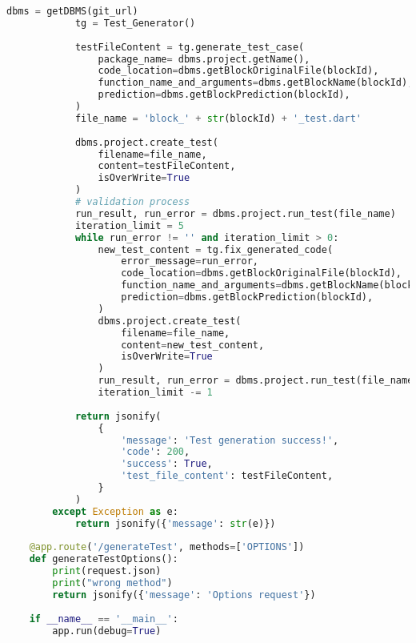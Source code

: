 \begin{lstlisting}[language=Python, caption={$\texttt{main.py}$ file.}, label={lst:15}]
            dbms = getDBMS(git_url)
            tg = Test_Generator()
            
            testFileContent = tg.generate_test_case(
                package_name= dbms.project.getName(),
                code_location=dbms.getBlockOriginalFile(blockId),
                function_name_and_arguments=dbms.getBlockName(blockId),
                prediction=dbms.getBlockPrediction(blockId),
            )
            file_name = 'block_' + str(blockId) + '_test.dart'
            
            dbms.project.create_test(
                filename=file_name,
                content=testFileContent,
                isOverWrite=True
            )
            # validation process
            run_result, run_error = dbms.project.run_test(file_name)
            iteration_limit = 5
            while run_error != '' and iteration_limit > 0:
                new_test_content = tg.fix_generated_code(
                    error_message=run_error,
                    code_location=dbms.getBlockOriginalFile(blockId),
                    function_name_and_arguments=dbms.getBlockName(blockId),
                    prediction=dbms.getBlockPrediction(blockId),
                )
                dbms.project.create_test(
                    filename=file_name,
                    content=new_test_content,
                    isOverWrite=True
                )
                run_result, run_error = dbms.project.run_test(file_name)
                iteration_limit -= 1
            
            return jsonify(
                {
                    'message': 'Test generation success!',
                    'code': 200,
                    'success': True,
                    'test_file_content': testFileContent,
                }
            )
        except Exception as e:
            return jsonify({'message': str(e)})
    
    @app.route('/generateTest', methods=['OPTIONS'])
    def generateTestOptions():
        print(request.json)
        print("wrong method")
        return jsonify({'message': 'Options request'})
        
    if __name__ == '__main__':
        app.run(debug=True)
\end{lstlisting}


